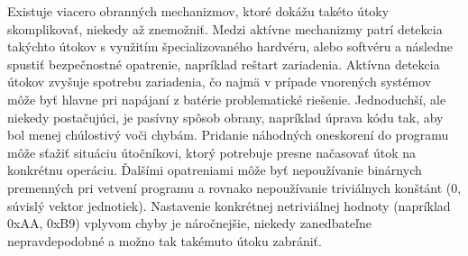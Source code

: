 Existuje viacero obranných mechanizmov, ktoré dokážu takéto útoky skomplikovať, niekedy až znemožniť. Medzi aktívne mechanizmy patrí detekcia takýchto útokov s využitím špecializovaného hardvéru, alebo softvéru a následne spustiť bezpečnostné opatrenie, napríklad reštart zariadenia. Aktívna detekcia útokov zvyšuje spotrebu zariadenia, čo najmä v prípade vnorených systémov môže byť hlavne pri napájaní z batérie problematické riešenie. Jednoduchší, ale niekedy postačujúci, je pasívny spôsob obrany, napríklad úprava kódu tak, aby bol menej chúlostivý voči chybám. Pridanie náhodných oneskorení do programu môže sťažiť situáciu útočníkovi, ktorý potrebuje presne načasovať útok na konkrétnu operáciu. Ďalšími opatreniami môže byť nepoužívanie binárnych premenných pri vetvení programu a rovnako nepoužívanie triviálnych konštánt (0, súvislý vektor jednotiek). Nastavenie konkrétnej netriviálnej hodnoty (napríklad 0xAA, 0xB9) vplyvom chyby je náročnejšie, niekedy zanedbateľne nepravdepodobné a možno tak takémuto útoku zabrániť.
